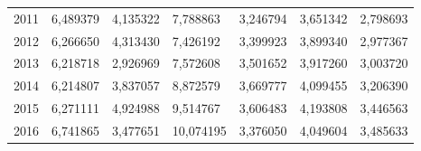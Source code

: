 \begin{table}
\begin{tabular}{p{1cm}p{2cm}p{2cm}p{2cm}p{2cm}p{2cm}p{2cm}}
 2011 &          6,489379 &     4,135322 &               7,788863 &        3,246794 &                           3,651342 &                           2,798693 \\
 2012 &          6,266650 &     4,313430 &               7,426192 &        3,399923 &                           3,899340 &                           2,977367 \\
 2013 &          6,218718 &     2,926969 &               7,572608 &        3,501652 &                           3,917260 &                           3,003720 \\
 2014 &          6,214807 &     3,837057 &               8,872579 &        3,669777 &                           4,099455 &                           3,206390 \\
 2015 &          6,271111 &     4,924988 &               9,514767 &        3,606483 &                           4,193808 &                           3,446563 \\
 2016 &          6,741865 &     3,477651 &              10,074195 &        3,376050 &                           4,049604 &                           3,485633 \\
\bottomrule
\end{tabular}
\end{table}
